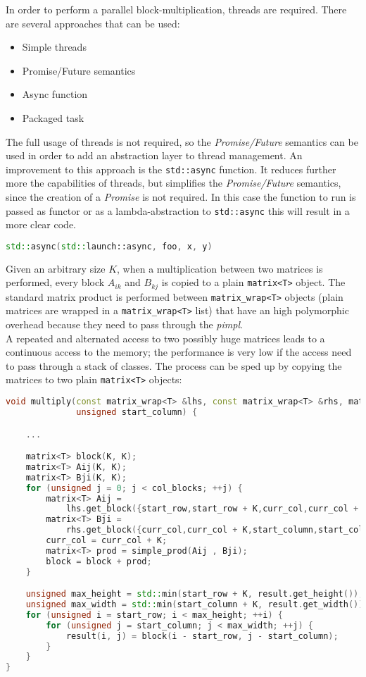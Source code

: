 \documentclass[11pt,a4paper]{article}
\begin{document}
In order to perform a parallel block-multiplication, threads are required. There
are several approaches that can be used:
\begin{itemize}
    \item Simple threads
    \item Promise/Future semantics
    \item Async function
    \item Packaged task
\end{itemize}
The full usage of threads is not required, so the \textit{Promise/Future} semantics
can be used in order to add an abstraction layer to thread management. An improvement
to this approach is the \verb!std::async! function. It reduces further more the
capabilities of threads, but simplifies the \textit{Promise/Future} semantics, since
the creation of a \textit{Promise} is not required. In this case the function to run
is passed as functor or as a lambda-abstraction to \verb!std::async! this will result
in a more clear code.
\begin{lstlisting}[language= C++]
std::async(std::launch::async, foo, x, y)
\end{lstlisting}
Given an arbitrary size $K$, when a multiplication between two matrices is performed,
every block $A_{ik}$ and $B_{kj}$ is copied to a plain \verb!matrix<T>! object. The
standard matrix product is performed between \verb!matrix_wrap<T>! objects (plain
matrices are wrapped in a \verb!matrix_wrap<T>! list) that have an high polymorphic
overhead because they need to pass through the \textit{pimpl}.\\ A repeated and
alternated access to two possibly huge matrices leads to a continuous access to the
memory; the performance is very low if the access need to pass through a stack of
classes. The process can be sped up by copying the matrices to two plain
\verb!matrix<T>! objects:
\newpage
\begin{lstlisting}[language= C++]
void multiply(const matrix_wrap<T> &lhs, const matrix_wrap<T> &rhs, matrix<T> &result, unsigned start_row,
              unsigned start_column) {

    ...

    matrix<T> block(K, K);
    matrix<T> Aij(K, K);
    matrix<T> Bji(K, K);
    for (unsigned j = 0; j < col_blocks; ++j) {
        matrix<T> Aij =
            lhs.get_block({start_row,start_row + K,curr_col,curr_col + K});
        matrix<T> Bji =
            rhs.get_block({curr_col,curr_col + K,start_column,start_column + K});
        curr_col = curr_col + K;
        matrix<T> prod = simple_prod(Aij , Bji);
        block = block + prod;
    }

    unsigned max_height = std::min(start_row + K, result.get_height());
    unsigned max_width = std::min(start_column + K, result.get_width());
    for (unsigned i = start_row; i < max_height; ++i) {
        for (unsigned j = start_column; j < max_width; ++j) {
            result(i, j) = block(i - start_row, j - start_column);
        }
    }
}
\end{lstlisting}
\end{document}

